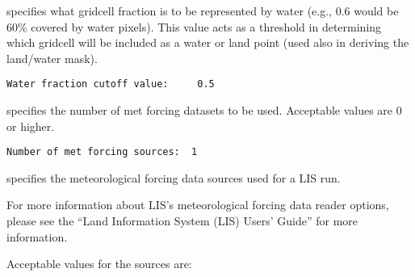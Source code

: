  
  specifies what gridcell
 fraction is to be represented by water (e.g., 0.6 would be 60\%
 covered by water pixels).  This value acts as a threshold in
 determining which gridcell will be included as a water
 or land point (used also in deriving the land/water mask). \\
 

 \begin{Verbatim}[frame=single]
Water fraction cutoff value:     0.5
 \end{Verbatim}

 
  specifies the
 number of met forcing datasets to be used. Acceptable
 values are 0 or higher.
 

 \begin{Verbatim}[frame=single]
Number of met forcing sources:  1
 \end{Verbatim}

 
  specifies the meteorological 
 forcing data sources used for a LIS run.

 For more information about LIS's meteorological forcing
 data reader options, please see the 
 ``Land Information System (LIS) Users' Guide'' for more
 information.

 Acceptable values for the sources are:

